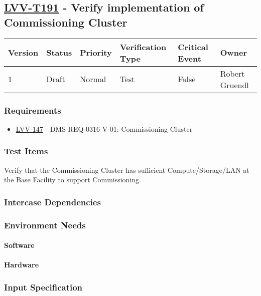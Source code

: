 \subsection{\href{https://jira.lsstcorp.org/secure/Tests.jspa\#/testCase/LVV-T191}{LVV-T191}
    - Verify implementation of Commissioning Cluster}\label{lvv-t191}

\begin{longtable}[]{llllll}
\toprule
Version & Status & Priority & Verification Type & Critical Event & Owner
\\\midrule
1 & Draft & Normal &
Test & False & Robert Gruendl
\\\bottomrule
\end{longtable}

\subsubsection{Requirements}
\begin{itemize}
\item \href{https://jira.lsstcorp.org/browse/LVV-147}{LVV-147} - DMS-REQ-0316-V-01: Commissioning Cluster
\end{itemize}

\subsubsection{Test Items}
Verify that the Commissioning Cluster has sufficient Compute/Storage/LAN
at the Base Facility to support Commissioning.



\subsubsection{Intercase Dependencies}

\subsubsection{Environment Needs}

\paragraph{Software}

\paragraph{Hardware}

\subsubsection{Input Specification}


